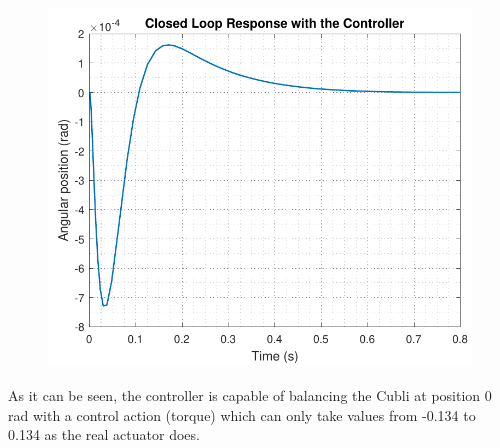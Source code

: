 \begin{minipage}{\linewidth}
\begin{minipage}{0.45\linewidth}
\begin{figure}[H]
			\includegraphics[scale=.56]{figures/PositionResponse}
			\centering
			\captionsetup{justification=centering}
			\label{PositionResponse}
		\end{figure}
	\end{minipage}
\end{minipage}

As it can be seen, the controller is capable of balancing the Cubli at position 0 rad with a control action (torque) which can only take values from -0.134 to 0.134 as the real actuator does.